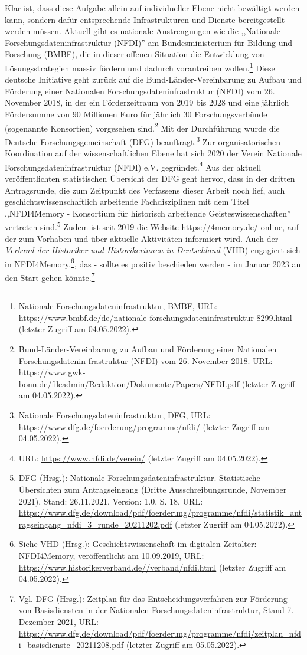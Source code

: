 Klar ist, dass diese Aufgabe allein auf individueller Ebene nicht bewältigt werden kann, sondern dafür entsprechende Infrastrukturen und Dienste bereitgestellt werden müssen. Aktuell gibt es nationale Anstrengungen wie die ,,Nationale Forschungsdateninfrastruktur (NFDI)'' am Bundesministerium für Bildung und Forschung (BMBF), die in dieser offenen Situation die Entwicklung von Lösungsstrategien massiv fördern und dadurch vorantreiben wollen.\footnote{Nationale Forschungsdateninfrastruktur, BMBF, URL: \url{https://www.bmbf.de/de/nationale-forschungsdateninfrastruktur-8299.html (letzter Zugriff am 04.05.2022).}} Diese deutsche Initiative geht zurück auf die Bund-Länder-Vereinbarung zu Aufbau und Förderung einer Nationalen Forschungsdateninfrastruktur (NFDI) vom 26. November 2018, in der ein Förderzeitraum von 2019 bis 2028 und eine jährlich Fördersumme von 90 Millionen Euro für jährlich 30 Forschungsverbünde (sogenannte Konsortien) vorgesehen sind.\footnote{Bund-Länder-Vereinbarung zu Aufbau und Förderung einer Nationalen Forschungsdatenin-frastruktur (NFDI) vom 26. November 2018. URL: \url{https://www.gwk-bonn.de/fileadmin/Redaktion/Dokumente/Papers/NFDI.pdf} (letzter Zugriff am 04.05.2022).} Mit der Durchführung wurde die Deutsche Forschungsgemeinschaft (DFG) beauftragt.\footnote{Nationale Forschungsdateninfrastruktur, DFG, URL: \url{https://www.dfg.de/foerderung/programme/nfdi/} (letzter Zugriff am 04.05.2022).} Zur organisatorischen Koordination auf der wissenschaftlichen Ebene hat sich 2020 der Verein Nationale Forschungsdateninfrastruktur (NFDI) e.V. gegründet.\footnote{URL: \url{https://www.nfdi.de/verein/} (letzter Zugriff am 04.05.2022).} Aus der aktuell veröffentlichten statistischen Übersicht der DFG geht hervor, dass in der dritten Antragsrunde, die zum Zeitpunkt des Verfassens dieser Arbeit noch lief, auch geschichtswissenschaftlich arbeitende Fachdisziplinen mit dem Titel ,,NFDI4Memory - Konsortium für historisch arbeitende Geisteswissenschaften'' vertreten sind.\footnote{DFG (Hrsg.): Nationale Forschungsdateninfrastruktur. Statistische Übersichten zum Antragseingang (Dritte Ausschreibungsrunde, November 2021), Stand: 26.11.2021, Version: 1.0, S. 18, URL: \url{https://www.dfg.de/download/pdf/foerderung/programme/nfdi/statistik_antragseingang_nfdi_3_runde_20211202.pdf} (letzter Zugriff am 04.05.2022).} Zudem ist seit 2019 die Website \url{https://4memory.de/} online, auf der zum Vorhaben und über aktuelle Aktivitäten informiert wird. Auch der \textit{Verband der Historiker und Historikerinnen in Deutschland} (VHD) engagiert sich in NFDI4Memory.\footnote{Siehe VHD (Hrsg.): Geschichtswissenschaft im digitalen Zeitalter: NFDI4Memory, veröffentlicht am 10.09.2019, URL: \url{https://www.historikerverband.de//verband/nfdi.html} (letzter Zugriff am 04.05.2022).}, das - sollte es positiv beschieden werden - im Januar 2023 an den Start gehen könnte.\footnote{Vgl. DFG (Hrsg.): Zeitplan für das Entscheidungsverfahren zur Förderung von Basisdiensten in der Nationalen Forschungsdateninfrastruktur, Stand 7. Dezember 2021, URL: \url{https://www.dfg.de/download/pdf/foerderung/programme/nfdi/zeitplan_nfdi_basisdienste_20211208.pdf} (letzter Zugriff am 05.05.2022).}


